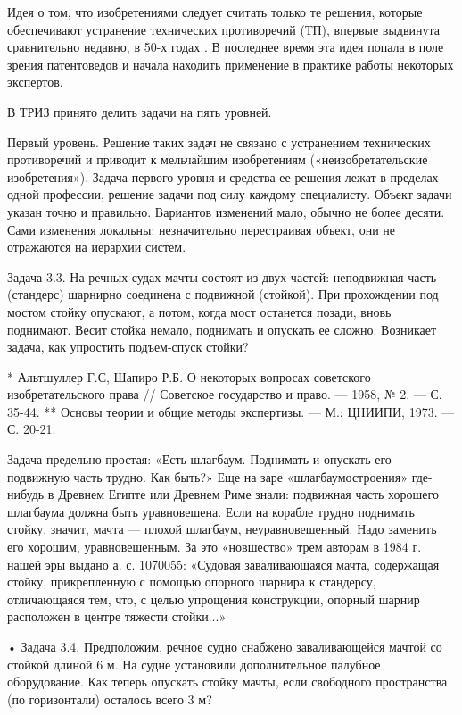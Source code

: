 Идея  о том,  что  изобретениями следует  считать  только те  решения,
которые обеспечивают устранение технических противоречий (ТП), впервые
выдвинута сравнительно недавно,  в 50-х годах . В  последнее время эта
идея попала в поле зрения  патентоведов и начала находить применение в
практике работы некоторых экспертов.


В ТРИЗ принято делить задачи на пять уровней.

Первый  уровень.   Решение  таких  задач  не   связано  с  устранением
технических   противоречий  и   приводит  к   мельчайшим  изобретениям
(«неизобретательские изобретения»).  Задача первого уровня  и средства
ее решения лежат  в пределах одной профессии, решение  задачи под силу
каждому специалисту. Объект задачи указан точно и правильно. Вариантов
изменений  мало,  обычно не  более  десяти.  Сами изменения  локальны:
незначительно  перестраивая  объект,  они не  отражаются  на  иерархии
систем.

Задача 3.3. На речных судах  мачты состоят из двух частей: неподвижная
часть  (стандерс)  шарнирно  соединена   с  подвижной  (стойкой).  При
прохождении под мостом стойку опускают,  а потом, когда мост останется
позади, вновь поднимают. Весит стойка  немало, поднимать и опускать ее
сложно. Возникает задача, как упростить подъем-спуск стойки?

* Альтшуллер Г.С, Шапиро Р.Б. О некоторых вопросах советского изобретательского права // Советское государство и право. — 1958, № 2. — С. 35-44.
** Основы теории и общие методы экспертизы. — М.: ЦНИИПИ, 1973. — С. 20-21.


Задача  предельно простая:  «Есть шлагбаум.  Поднимать и  опускать его
подвижную  часть трудно.  Как быть?»  Еще на  заре «шлагбаумостроения»
где-нибудь в  Древнем Египте или  Древнем Риме знали:  подвижная часть
хорошего шлагбаума  должна быть  уравновешена. Если на  корабле трудно
поднимать стойку,  значит, мачта — плохой  шлагбаум, неуравновешенный.
Надо  заменить его  хорошим, уравновешенным.  За это  «новшество» трем
авторам  в  1984   г.  нашей  эры  выдано  а.   с.  1070055:  «Судовая
заваливающаяся  мачта,  содержащая  стойку,  прикрепленную  с  помощью
опорного шарнира к стандерсу, отличающаяся тем, что, с целью упрощения
конструкции, опорный шарнир расположен в центре тяжести стойки...»

• Задача 3.4. Предположим, речное судно снабжено заваливающейся мачтой
со стойкой  длиной 6  м. На  судне установили  дополнительное палубное
оборудование.  Как  теперь  опускать  стойку  мачты,  если  свободного
пространства (по горизонтали) осталось всего 3 м?

